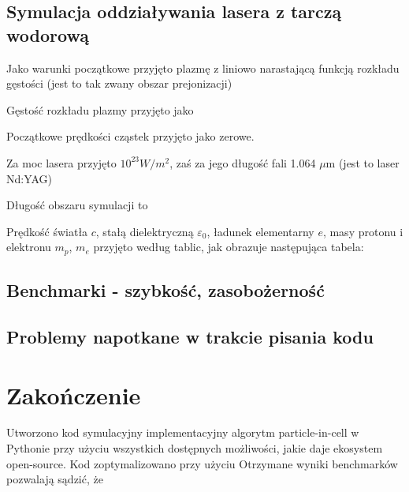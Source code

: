 \subsection{Symulacja oddziaływania lasera z tarczą wodorową}

Jako warunki początkowe przyjęto plazmę z liniowo narastającą funkcją rozkładu gęstości (jest to tak zwany obszar prejonizacji) %

Gęstość rozkładu plazmy przyjęto jako

Początkowe prędkości cząstek przyjęto jako zerowe. %

Za moc lasera przyjęto $10^{23} W/m^2$, %
zaś za jego długość fali 1.064 $\mu$m (jest to laser Nd:YAG)

Długość obszaru symulacji to %

Prędkość światła $c$, stałą dielektryczną $\varepsilon_0$, ładunek elementarny $e$, masy protonu i elektronu $m_p$, $m_e$ przyjęto według tablic,
jak obrazuje następująca tabela:


\subsection{Benchmarki - szybkość, zasobożerność} %
\subsection{Problemy napotkane w trakcie pisania kodu}

\section[Zakończenie]{Zakończenie} %
Utworzono kod symulacyjny implementacyjny algorytm particle-in-cell w Pythonie przy użyciu wszystkich dostępnych
możliwości, jakie daje ekosystem open-source. Kod zoptymalizowano przy użyciu %
Otrzymane wyniki benchmarków pozwalają sądzić, że %

